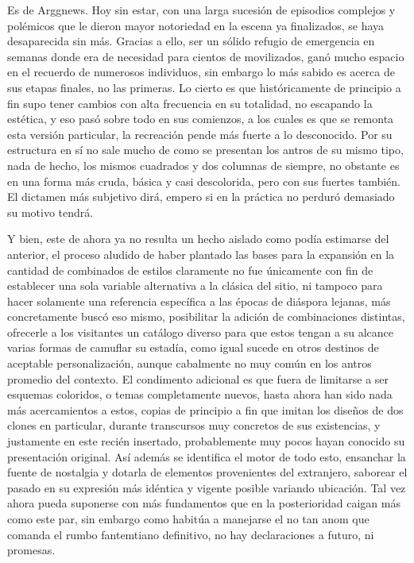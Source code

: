 \documentclass[
]{book}
\begin{document}
Es de Arggnews. Hoy sin estar, con una larga sucesión de episodios complejos y polémicos que le dieron mayor notoriedad en la escena ya finalizados, se haya desaparecida sin más. Gracias a ello, ser un sólido refugio de emergencia en semanas donde era de necesidad para cientos de movilizados, ganó mucho espacio en el recuerdo de numerosos individuos, sin embargo lo más sabido es acerca de sus etapas finales, no las primeras. Lo cierto es que históricamente de principio a fin supo tener cambios con alta frecuencia en su totalidad, no escapando la estética, y eso pasó sobre todo en sus comienzos, a los cuales es que se remonta esta versión particular, la recreación pende más fuerte a lo desconocido. Por su estructura en sí no sale mucho de como se presentan los antros de su mismo tipo, nada de hecho, los mismos cuadrados y dos columnas de siempre, no obstante es en una forma más cruda, básica y casi descolorida, pero con sus fuertes también. El dictamen más subjetivo dirá, empero si en la práctica no perduró demasiado su motivo tendrá.

Y bien, este de ahora ya no resulta un hecho aislado como podía estimarse del anterior, el proceso aludido de haber plantado las bases para la expansión en la cantidad de combinados de estilos claramente no fue únicamente con fin de establecer una sola variable alternativa a la clásica del sitio, ni tampoco para hacer solamente una referencia específica a las épocas de diáspora lejanas, más concretamente buscó eso mismo, posibilitar la adición de combinaciones distintas, ofrecerle a los visitantes un catálogo diverso para que estos tengan a su alcance varias formas de camuflar su estadía, como igual sucede en otros destinos de aceptable personalización, aunque cabalmente no muy común en los antros promedio del contexto. El condimento adicional es que fuera de limitarse a ser esquemas coloridos, o temas completamente nuevos, hasta ahora han sido nada más acercamientos a estos, copias de principio a fin que imitan los diseños de dos clones en particular, durante transcursos muy concretos de sus existencias, y justamente en este recién insertado, probablemente muy pocos hayan conocido su presentación original. Así además se identifica el motor de todo esto, ensanchar la fuente de nostalgia y dotarla de elementos provenientes del extranjero, saborear el pasado en su expresión más idéntica y vigente posible variando ubicación. Tal vez ahora pueda suponerse con más fundamentos que en la posterioridad caigan más como este par, sin embargo como habitúa a manejarse el no tan anom que comanda el rumbo fantemtiano definitivo, no hay declaraciones a futuro, ni promesas.
\end{document}
